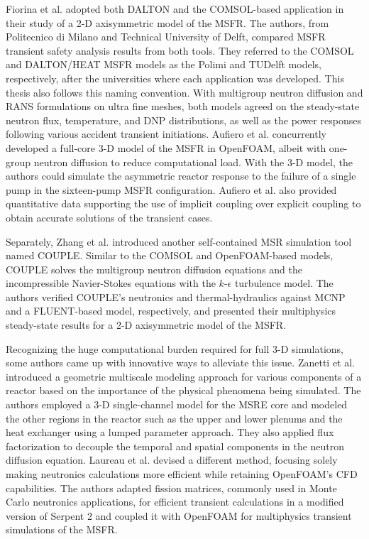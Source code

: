 Fiorina et al. \cite{fiorina_modelling_2014} adopted both DALTON and the
COMSOL-based application in their study of a 2-D axisymmetric model of the
\gls{MSFR}. The authors, from Politecnico di Milano and Technical University
of Delft, compared \gls{MSFR} transient safety analysis results from both
tools. They referred to the COMSOL and DALTON/HEAT
\gls{MSFR} models as the Polimi and TUDelft models, respectively, after the
universities where each application was developed. This thesis also follows
this naming convention. With
multigroup neutron diffusion and \gls{RANS} formulations on ultra fine meshes,
both models agreed on the steady-state neutron flux, temperature,
and \gls{DNP} distributions, as well as the power responses following various
accident transient initiations.
Aufiero et al. \cite{aufiero_development_2014} concurrently developed
a full-core 3-D model of the \gls{MSFR} in OpenFOAM, albeit with one-group
neutron diffusion to reduce computational load. With the 3-D model, the
authors could simulate the asymmetric reactor response to the failure of a
single pump in the sixteen-pump \gls{MSFR} configuration. Aufiero et al. also
provided quantitative data supporting the use of implicit coupling over
explicit coupling to obtain accurate solutions of the transient cases.

Separately, Zhang et al. \cite{zhang_couple_2014} introduced another
self-contained \gls{MSR} simulation tool named COUPLE. Similar to the COMSOL
and OpenFOAM-based models, COUPLE solves the multigroup neutron diffusion
equations and the incompressible Navier-Stokes equations with the
$k$-$\epsilon$ turbulence model. The authors verified COUPLE's neutronics and
thermal-hydraulics against MCNP and a FLUENT-based model, respectively, and
presented their multiphysics steady-state results for a 2-D axisymmetric
model of the \gls{MSFR}.

Recognizing the huge computational burden required for full 3-D simulations, 
some authors came up with innovative ways to alleviate this issue. Zanetti et
al. \cite{zanetti_geometric_2015} introduced a geometric multiscale modeling
approach for various components of a reactor based on the importance of
the physical phenomena being simulated. The authors employed a 3-D 
single-channel model for the \gls{MSRE} core and modeled the other
regions in the reactor such as the upper and lower plenums and the heat
exchanger using a lumped parameter approach. They also applied flux
factorization to decouple the temporal and spatial components in the neutron
diffusion equation. Laureau et al. \cite{laureau_transient_2017} devised a
different method, focusing solely making neutronics calculations more
efficient while retaining OpenFOAM's \gls{CFD} capabilities. The authors
adapted fission matrices, commonly used in Monte Carlo neutronics
applications, for efficient transient calculations in a modified version of
Serpent 2 \cite{leppanen_serpent_2014} and coupled it with OpenFOAM for
multiphysics transient simulations of the \gls{MSFR}.

